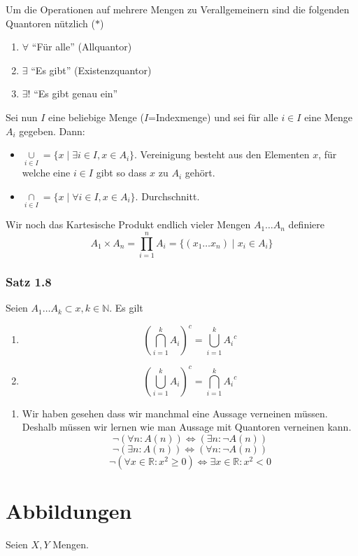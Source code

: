 Um die Operationen auf mehrere Mengen zu Verallgemeinern sind die folgenden Quantoren nützlich ($\ast$)
\begin{enumerate}
\item $\forall$ ``Für alle'' (Allquantor)
\item $\exists$ ``Es gibt'' (Existenzquantor)
\item $\exists !$ ``Es gibt genau ein''
\end{enumerate}
Sei nun $I$ eine beliebige Menge ($I$=Indexmenge) und sei für alle $i\in I$ eine Menge $A_i$ gegeben. Dann:
\begin{itemize}
\item $\mathop { \cup {A_i}}\limits_{i \in I} = \{x\mid \exists i\in I,x\in A_i\}$. Vereinigung besteht aus den Elementen $x$, für welche eine $i\in I$ gibt so dass $x$ zu $A_i$ gehört.
\item  $\mathop { \cap {A_i}}\limits_{i \in I} = \{x\mid \forall i\in I,x\in A_i\}$. Durchschnitt. 
\end{itemize}
Wir  noch das Kartesische Produkt endlich vieler Mengen $A_1 \dots A_n$ definiere \[{A_1} \times {A_n} = \prod\limits_{i = 1}^n {{A_i} = \{ ({x_1} \ldots {x_n})\mid {x_i} \in {A_i}} \} \]

\subsubsection*{Satz 1.8}
Seien $A_1 \dots A_k \subset x,k\in \mathbb{N}$. Es gilt
\begin{enumerate}
\item \[{\left( {\bigcap\limits_{i = 1}^k {{A_i}} } \right)^c} = \bigcup\limits_{i = 1}^k {{A_i}^c} \]
\item \[{\left( {\bigcup\limits_{i = 1}^k {{A_i}} } \right)^c} = \bigcap\limits_{i = 1}^k {{A_i}^c} \]
\end{enumerate}
\begin{enumerate}[($\ast$)]
\item Wir haben gesehen dass wir manchmal eine Aussage verneinen müssen. Deshalb müssen wir lernen wie man Aussage mit Quantoren verneinen kann.
\[\neg\left(\forall n:A(n)\right)\Leftrightarrow\left(\exists n:\neg A(n)\right)\]
\[\neg\left(\exists n:A(n)\right)\Leftrightarrow\left(\forall n:\neg A(n)\right)\]
\[\neg\left(\forall x\in \mathbb{R}:x^2\geq 0\right)\Leftrightarrow\exists x\in\mathbb{R}:x^2<0\]
\end{enumerate}
\section{Abbildungen}
Seien $X,Y$ Mengen. 

